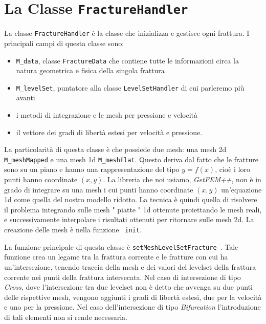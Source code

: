 \section{La Classe \texttt{FractureHandler}}

La classe  \texttt{FractureHandler} è la classe che inizializza e gestisce ogni frattura. I principali campi di questa classe sono:
\begin{itemize}
\item \texttt{M\_data}, classe \texttt{FractureData} che contiene tutte le informazioni circa la natura geometrica e fisica della singola frattura
\item \texttt{M\_levelSet}, puntatore alla classe \texttt{LevelSetHandler} di cui parleremo più avanti
\item i metodi di integrazione e le mesh per pressione e velocità
\item il vettore dei gradi di libertà estesi per velocità e pressione.
\end{itemize}

La particolarità di questa classe è che possiede due mesh: una mesh 2d \texttt{M\_meshMapped} e una mesh 1d \texttt{M\_meshFlat}. Questo deriva dal fatto che le fratture sono su un piano e hanno una rappresentazione del tipo $y=f(x)$, cioè i loro punti hanno coordinate $(x,y)$. La libreria che noi usiamo, \textit{GetFEM++}, non è in grado di integrare su una mesh i cui punti hanno coordinate $(x,y)$ un'equazione 1d come quella del nostro modello ridotto. La tecnica è quindi quella di risolvere il problema integrando sulle mesh " piatte " 1d ottenute proiettando le mesh reali, e successivamente interpolare i risultati ottenuti per ritornare sulle mesh 2d. La creazione delle mesh è nella funzione \texttt{ init}.
\par La funzione principale di questa classe è  \texttt{setMeshLevelSetFracture }.
Tale funzione crea un legame tra la frattura corrente e le fratture con cui ha un'intersezione, tenendo traccia della mesh e dei valori del levelset della frattura corrente nei punti della frattura intersecata. Nel caso di intersezione di tipo \textit{Cross}, dove l'intersezione tra due levelset non è detto che avvenga su due punti delle rispettive mesh, vengono aggiunti i gradi di libertà estesi, due per la velocità e uno per la pressione. Nel caso dell'intersezione di tipo \textit{Bifurcation} l'introduzione di tali elementi non si rende necessaria.


